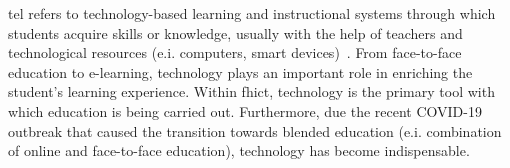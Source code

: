 \Acrfull{tel} refers to technology-based learning and instructional systems through which students acquire skills or knowledge, usually with the help of teachers and technological resources (e.i. computers, smart devices)~\cite{tel2005}. 
From face-to-face education to e-learning, technology plays an important role in enriching the student's learning experience. Within \acrshort{fhict}, technology is the primary tool with which education is being carried out. 
Furthermore, due the recent COVID-19 outbreak that caused the transition towards blended education (e.i. combination of online and face-to-face education),  technology has become indispensable.